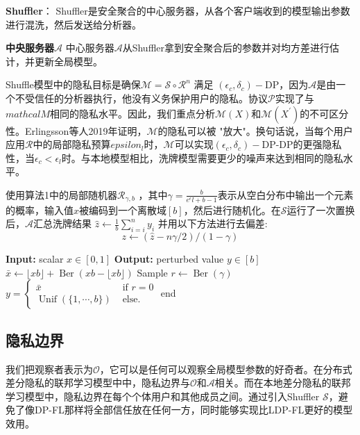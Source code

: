 \textbf{Shuffler}：
Shuffler是安全聚合的中心服务器，从各个客户端收到的模型输出参数进行混洗，然后发送给分析器。

\textbf{中央服务器$\mathcal{A}$}
中心服务器$\mathcal{A}$从Shuffler拿到安全聚合后的参数并对均方差进行估计，并更新全局模型。

Shuffle模型中的隐私目标是确保$\mathcal{M}=\mathcal{S} \circ \mathcal{R}^{n}$ 满足 $\left(\epsilon_{c}, \delta_{c}\right)-\mathrm{DP}$，因为$\mathcal{A}$是由一个不受信任的分析器执行，他没有义务保护用户的隐私。协议$\mathcal{P}$实现了与$mathcal{M}$相同的隐私水平。因此，我们重点分析$\mathcal{M}(X)$和$\mathcal{M}\left(X^{\prime}\right)$的不可区分性。Erlingsson等人2019年证明，$\mathcal{M}$的隐私可以被 "放大"。换句话说，当每个用户应用$\mathcal{R}$中的局部隐私预算$epsilon_{l}$时，$\mathcal{M}$可以实现$\left(\epsilon_{c}, \delta_{c}\right)-\mathrm{DP}$-DP的更强隐私性，当$\epsilon_{c}<\epsilon_{l}$时。与本地模型相比，洗牌模型需要更少的噪声来达到相同的隐私水平。

使用算法1中的局部随机器$\mathcal{R}_{\gamma, b}$ ，其中$\gamma=\frac{b}{e^{\epsilon} l+b-1}$表示从空白分布中输出一个元素的概率，输入值$x$被编码到一个离散域$[b]$，然后进行随机化。在$\mathcal{S}$运行了一次置换后，$\mathcal{A}$汇总洗牌结果 $\hat{z} \leftarrow \frac{1}{b} \sum_{i=i}^{n} y_{i}$ 并用以下方法进行去偏差:
\begin{equation}\label{eq:shuffle去偏差}
z \leftarrow(\hat{z}-n \gamma / 2) /(1-\gamma)
\end{equation}

\begin{algorithm}[!htb]
  \caption{$\mathcal{R}_{\gamma, b}:[0,1] \rightarrow[b]$}
  \label{shuffle algorithm}
  \begin{algorithmic}[1]
    \footnotesize
    \STATE \textbf{Input:} scalar $x \in[0,1]$
    \STATE \textbf{Output:} perturbed value $y \in[b]$
      \STATE $\bar{x} \leftarrow\lfloor x b\rfloor+\operatorname{Ber}(x b-\lfloor x b\rfloor)$
      \STATE Sample $r \leftarrow \operatorname{Ber}(\gamma)$
      \STATE $y=\left\{\begin{array}{ll}\bar{x} & \text { if } r=0 \\ \operatorname{Unif}(\{1, \cdots, b\}) & \text { else. }\end{array}\right.$
    \STATE end
  \end{algorithmic}
\end{algorithm}

\subsection{隐私边界}
我们把观察者表示为$\mathcal{O}$，它可以是任何可以观察全局模型参数的好奇者。在分布式差分隐私的联邦学习模型中中，隐私边界与$\mathcal{O}$和$\mathcal{A}$相关。而在本地差分隐私的联邦学习模型中，隐私边界在每个个体用户和其他成员之间。通过引入Shuffler $\mathcal{S}$，避免了像DP-FL那样将全部信任放在任何一方，同时能够实现比LDP-FL更好的模型效用。

